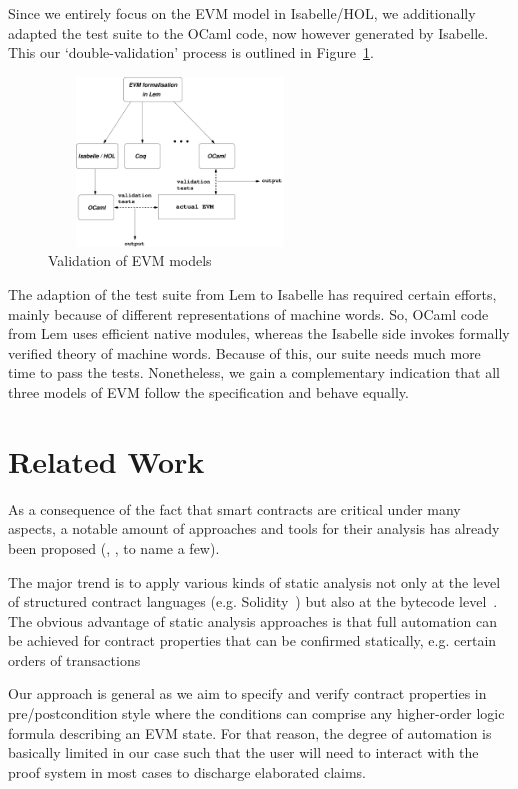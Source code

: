 \documentclass[sigplan,10pt,review]{acmart}\settopmatter{printfolios=true,printccs=false,printacmref=false}
\begin{document}
Since we entirely focus on the EVM model in Isabelle/HOL, we additionally adapted the test suite 
to the OCaml code, now however generated by Isabelle. This our `double-validation' 
process is outlined in Figure~\ref{fig:valid}.          
\begin{figure}[htbp]
\centering
\includegraphics[height=4.5cm, width=7cm]{images/evm_lem}    
\caption{Validation of EVM models}
\label{fig:valid}
\end{figure}
The adaption of the test suite from Lem to Isabelle has required certain efforts, mainly because 
of different representations of machine words. So, OCaml code from Lem uses efficient native modules,
whereas the Isabelle side invokes formally verified theory of machine words. Because of this, our suite
needs much more time to pass the tests. Nonetheless, we gain a complementary indication that
all three models of EVM follow the specification and behave equally.    
%
\section{Related Work}
\label{sec:rwork}
As a consequence of the fact that smart contracts are critical under many aspects, a notable amount of
approaches and tools for their analysis has already been proposed 
(\cite{Bhargavan:2016:FVS:2993600.2993611}, \cite{securify}, \cite{openzeppelin} to name a few).
 
The major trend is to apply various kinds of static analysis not only at the level of structured contract
languages (e.g. Solidity~\cite{openzeppelin}) but also at the bytecode level~\cite{securify}. 
%
The obvious advantage of static analysis approaches is that full automation can be achieved for 
contract properties that can be confirmed statically, e.g. certain orders of transactions \cite{securify} 
 
Our approach is general as we aim to specify and verify contract properties in pre/postcondition
style where the conditions can comprise any higher-order logic formula describing an EVM state. 
For that reason, the degree of automation is basically limited in our case such that the user will need to interact 
with the proof system in most cases to discharge elaborated claims. 
\end{document}
